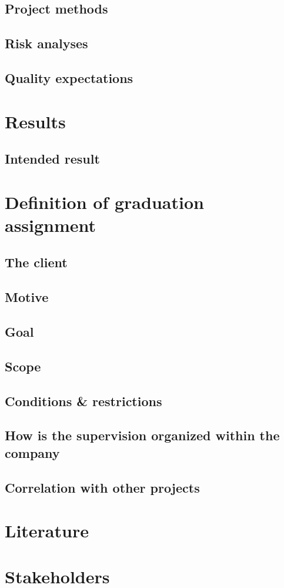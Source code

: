\section{Project methods}
\section{Risk analyses}
\section{Quality expectations}

\chapter{Results}
\section{Intended result}

\chapter{Definition of graduation assignment}
\section{The client}
\section{Motive}
\section{Goal}
\section{Scope}
\section{Conditions \& restrictions}
\section{How is the supervision organized within the company}
\section{Correlation with other projects}

\chapter{Literature}

\chapter{Stakeholders}


